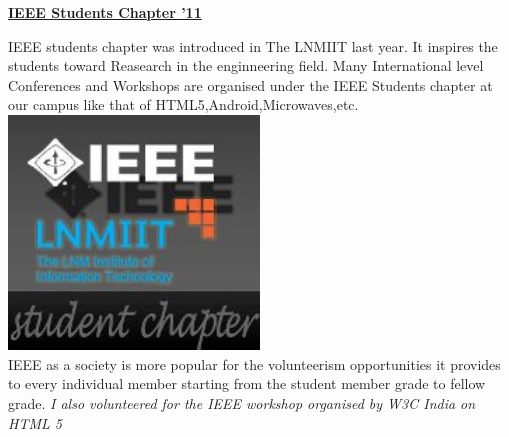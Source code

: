 \documentclass{report}
\begin{document}
\vspace{1in}
\begin{center}\huge{\bf \underline{IEEE Students Chapter '11}}\end{center}
\vspace{.15in}
\begin{center}
\hspace{.5in} IEEE students  chapter was introduced in The LNMIIT last year. It inspires the students toward Reasearch in the enginneering field. Many International level Conferences and Workshops are organised under the IEEE Students chapter at our campus like that of HTML5,Android,Microwaves,etc.
\vspace{.5in}\\
\includegraphics [width=0.50\textwidth]{p5.jpg}
\vspace{.5in}\\
 IEEE as a society is more popular for the volunteerism opportunities it provides to every individual member starting from the student member grade to fellow grade. 
\emph{I also volunteered for the IEEE workshop organised by W3C India on HTML 5}
\end{center}
\end{document}
